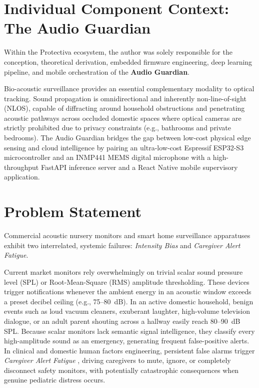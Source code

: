 \documentclass[12pt, a4paper]{report}
\begin{document}
\section{Individual Component Context: The Audio Guardian}
Within the Protectiva ecosystem, the author was solely responsible for the conception, theoretical derivation, embedded firmware engineering, deep learning pipeline, and mobile orchestration of the \textbf{Audio Guardian}. 

Bio-acoustic surveillance provides an essential complementary modality to optical tracking. Sound propagation is omnidirectional and inherently non-line-of-sight (NLOS), capable of diffracting around household obstructions and penetrating acoustic pathways across occluded domestic spaces where optical cameras are strictly prohibited due to privacy constraints (e.g., bathrooms and private bedrooms). The Audio Guardian bridges the gap between low-cost physical edge sensing and cloud intelligence by pairing an ultra-low-cost Espressif ESP32-S3 microcontroller and an INMP441 MEMS digital microphone with a high-throughput FastAPI inference server and a React Native mobile supervisory application.

\section{Problem Statement}
Commercial acoustic nursery monitors and smart home surveillance apparatuses exhibit two interrelated, systemic failures: \textit{Intensity Bias} and \textit{Caregiver Alert Fatigue}. 

Current market monitors rely overwhelmingly on trivial scalar sound pressure level (SPL) or Root-Mean-Square (RMS) amplitude thresholding. These devices trigger notifications whenever the ambient energy in an acoustic window exceeds a preset decibel ceiling (e.g., 75--80~dB). In an active domestic household, benign events such as loud vacuum cleaners, exuberant laughter, high-volume television dialogue, or an adult parent shouting across a hallway easily reach 80--90~dB SPL. Because scalar monitors lack semantic signal intelligence, they classify every high-amplitude sound as an emergency, generating frequent false-positive alerts. In clinical and domestic human factors engineering, persistent false alarms trigger \textit{Caregiver Alert Fatigue} \cite{ref_sendelbach2013}, driving caregivers to mute, ignore, or completely disconnect safety monitors, with potentially catastrophic consequences when genuine pediatric distress occurs.
\end{document}
